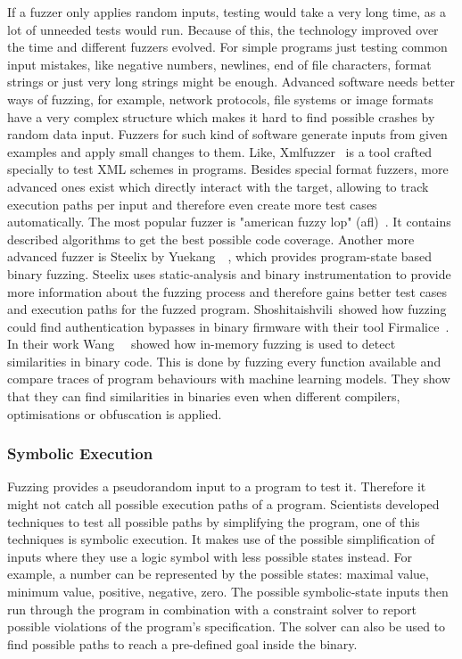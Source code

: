 If a fuzzer only applies random inputs, testing would take a very long time, as
a lot of unneeded tests would run. Because of this, the technology improved over
the time and different fuzzers evolved. For simple programs just testing common
input mistakes, like negative numbers, newlines, end of file characters, format
strings or just very long strings might be enough. Advanced software needs
better ways of fuzzing, for example, network protocols, file systems or image
formats have a very complex structure which makes it hard to find possible
crashes by random data input. Fuzzers for such kind of software generate inputs
from given examples and apply small changes to them. Like,
Xmlfuzzer~\cite{xmlfuzzer} is a tool crafted specially to test XML schemes in
programs. Besides special format fuzzers, more advanced ones exist which
directly interact with the target, allowing to track execution paths per input
and therefore even create more test cases automatically. The most popular fuzzer
is "american fuzzy lop" (afl)~\cite{aflweb}. It contains described algorithms to
get the best possible code coverage. Another more advanced fuzzer is Steelix by
Yuekang~\etal~\cite{steelix}, which provides program-state based binary fuzzing.
Steelix uses static-analysis and binary instrumentation to provide more
information about the fuzzing process and therefore gains better test cases and
execution paths for the fuzzed program. Shoshitaishvili~\etal showed how fuzzing
could find authentication bypasses in binary firmware with their tool
Firmalice~\cite{firmalice}. In their work Wang~\etal~\cite{inmemfuzzing} showed
how in-memory fuzzing is used to detect similarities in binary code. This is
done by fuzzing every function available and compare traces of program
behaviours with machine learning models. They show that they can find
similarities in binaries even when different compilers, optimisations or
obfuscation is applied.

\subsubsection{Symbolic Execution}

Fuzzing provides a pseudorandom input to a program to test it. Therefore it
might not catch all possible execution paths of a program. Scientists developed
techniques to test all possible paths by simplifying the program,  one of this
techniques is symbolic execution. It makes use of the possible simplification of
inputs where they use a logic symbol with less possible states instead. For
example, a number can be represented by the possible states: maximal value,
minimum value, positive, negative, zero. The possible symbolic-state inputs then
run through the program in combination with a constraint solver to report
possible violations of the program's specification. The solver can also be used
to find possible paths to reach a pre-defined goal inside the binary.

